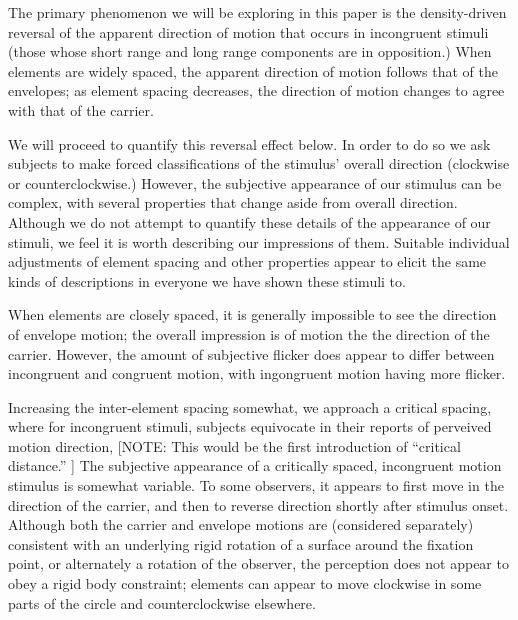 \documentclass[english,jou]{article}
\newenvironment{lyxgreyedout}
  {\textcolor{note_fontcolor}\bgroup\ignorespaces}
  {\ignorespacesafterend\egroup}
\begin{document}
The primary phenomenon we will be exploring in this paper is the density-driven
reversal of the apparent direction of motion  that occurs in incongruent
stimuli (those whose short range and long range components are in
opposition.) When elements are widely spaced, the apparent direction
of motion follows that of the envelopes; as element spacing decreases,
the direction of motion changes to agree with that of the carrier.



We will proceed to quantify this reversal effect below. In order to
do so we ask subjects to make forced classifications of the stimulus'
overall direction (clockwise or counterclockwise.) However, the subjective
appearance of our stimulus can be complex, with several properties
that change aside from overall direction. Although we do not attempt
to quantify these details of the appearance of our stimuli, we feel
it is worth describing our impressions of them. Suitable individual
adjustments of element spacing and other properties appear to elicit
the same kinds of descriptions in everyone we have shown these stimuli
to.

When elements are closely spaced, it is generally impossible to see
the direction of envelope motion; the overall impression is of motion
the the direction of the carrier. However, the amount of subjective
flicker does appear to differ between incongruent and congruent motion,
with ingongruent motion having more flicker.

Increasing the inter-element spacing somewhat, we approach a critical
spacing, where for incongruent stimuli, subjects equivocate in their
reports of perveived motion direction, %
\begin{lyxgreyedout}
{[}NOTE: This would be the first introduction of ``critical distance.''
{]}%
\end{lyxgreyedout}
{} The subjective appearance of a critically spaced, incongruent motion
stimulus is somewhat variable. To some observers, it appears to first
move in the direction of the carrier, and then to reverse direction
shortly after stimulus onset. Although both the carrier and envelope
motions are (considered separately) consistent with an underlying
rigid rotation of a surface around the fixation point, or alternately
a rotation of the observer, the perception does not appear to obey
a rigid body constraint; elements can appear to move clockwise in
some parts of the circle and counterclockwise elsewhere. 
\end{document}
